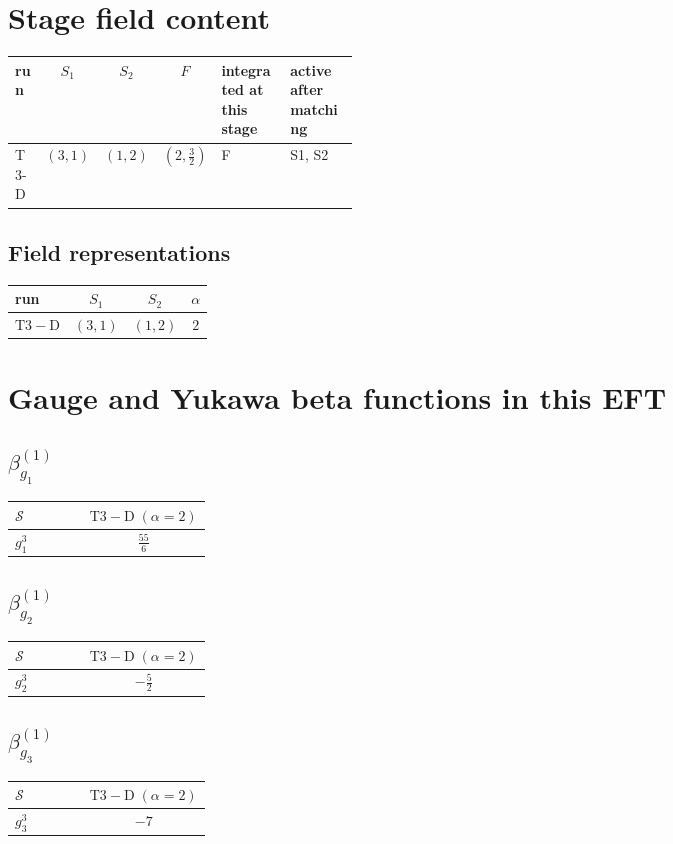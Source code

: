 \documentclass[9pt]{article}
\begin{document}
\section*{Stage field content}
\begin{longtable}{@{}lccc p{0.20\linewidth}p{0.20\linewidth}@{}}
\toprule
run & $S_1$ & $S_2$ & $F$ & integrated at this stage & active after matching \\
\midrule
T3-D & $(3,1)$ & $(1,2)$ & $(2,\frac{3}{2})$ & F & S1, S2 \\
\bottomrule
\end{longtable}
\subsection*{Field representations}
\begin{longtable}{@{}lccc@{}}
\toprule
run & $S_1$ & $S_2$ & $\alpha$ \\
\midrule
$\mathrm{T3-D}$ & $(3,1)$ & $(1,2)$ & $2$ \\
\bottomrule
\end{longtable}
\section*{Gauge and Yukawa beta functions in this EFT}
\subsection*{$ \beta_{g_1}^{(1)} $}
\begin{longtable}{@{}p{0.38\linewidth}c@{}}
\toprule
$\mathcal{S}$ & $ \mathrm{T3-D}\;(\alpha=2) $ \\
\midrule
$ g_1^3 $ & $ \frac{55}{6} $ \\
\bottomrule
\end{longtable}
\subsection*{$ \beta_{g_2}^{(1)} $}
\begin{longtable}{@{}p{0.38\linewidth}c@{}}
\toprule
$\mathcal{S}$ & $ \mathrm{T3-D}\;(\alpha=2) $ \\
\midrule
$ g_2^3 $ & $ - \frac{5}{2} $ \\
\bottomrule
\end{longtable}
\subsection*{$ \beta_{g_3}^{(1)} $}
\begin{longtable}{@{}p{0.38\linewidth}c@{}}
\toprule
$\mathcal{S}$ & $ \mathrm{T3-D}\;(\alpha=2) $ \\
\midrule
$ g_3^3 $ & $ -7 $ \\
\bottomrule
\end{longtable}
\end{document}
